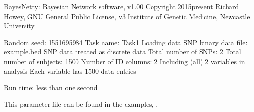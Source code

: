 \documentclass[letterpaper,10pt,english]{sphinxmanual}
\begin{document}
\begin{sphinxVerbatim}[commandchars=\\\{\}]
BayesNetty: Bayesian Network software, v1.00
\PYGZhy{}\PYGZhy{}\PYGZhy{}\PYGZhy{}\PYGZhy{}\PYGZhy{}\PYGZhy{}\PYGZhy{}\PYGZhy{}\PYGZhy{}\PYGZhy{}\PYGZhy{}\PYGZhy{}\PYGZhy{}\PYGZhy{}\PYGZhy{}\PYGZhy{}\PYGZhy{}\PYGZhy{}\PYGZhy{}\PYGZhy{}\PYGZhy{}\PYGZhy{}\PYGZhy{}\PYGZhy{}\PYGZhy{}\PYGZhy{}\PYGZhy{}\PYGZhy{}\PYGZhy{}\PYGZhy{}\PYGZhy{}\PYGZhy{}\PYGZhy{}\PYGZhy{}\PYGZhy{}\PYGZhy{}\PYGZhy{}\PYGZhy{}\PYGZhy{}\PYGZhy{}\PYGZhy{}\PYGZhy{}\PYGZhy{}\PYGZhy{}\PYGZhy{}\PYGZhy{}\PYGZhy{}\PYGZhy{}\PYGZhy{}
Copyright 2015\PYGZhy{}present Richard Howey, GNU General Public License, v3
Institute of Genetic Medicine, Newcastle University

Random seed: 1551695984
\PYGZhy{}\PYGZhy{}\PYGZhy{}\PYGZhy{}\PYGZhy{}\PYGZhy{}\PYGZhy{}\PYGZhy{}\PYGZhy{}\PYGZhy{}\PYGZhy{}\PYGZhy{}\PYGZhy{}\PYGZhy{}\PYGZhy{}\PYGZhy{}\PYGZhy{}\PYGZhy{}\PYGZhy{}\PYGZhy{}\PYGZhy{}\PYGZhy{}\PYGZhy{}\PYGZhy{}\PYGZhy{}\PYGZhy{}\PYGZhy{}\PYGZhy{}\PYGZhy{}\PYGZhy{}\PYGZhy{}\PYGZhy{}\PYGZhy{}\PYGZhy{}\PYGZhy{}\PYGZhy{}\PYGZhy{}\PYGZhy{}\PYGZhy{}\PYGZhy{}\PYGZhy{}\PYGZhy{}\PYGZhy{}\PYGZhy{}\PYGZhy{}\PYGZhy{}\PYGZhy{}\PYGZhy{}\PYGZhy{}\PYGZhy{}
Task name: Task\PYGZhy{}1
Loading data
SNP binary data file: example.bed
SNP data treated as discrete data
Total number of SNPs: 2
Total number of subjects: 1500
Number of ID columns: 2
Including (all) 2 variables in analysis
Each variable has 1500 data entries
\PYGZhy{}\PYGZhy{}\PYGZhy{}\PYGZhy{}\PYGZhy{}\PYGZhy{}\PYGZhy{}\PYGZhy{}\PYGZhy{}\PYGZhy{}\PYGZhy{}\PYGZhy{}\PYGZhy{}\PYGZhy{}\PYGZhy{}\PYGZhy{}\PYGZhy{}\PYGZhy{}\PYGZhy{}\PYGZhy{}\PYGZhy{}\PYGZhy{}\PYGZhy{}\PYGZhy{}\PYGZhy{}\PYGZhy{}\PYGZhy{}\PYGZhy{}\PYGZhy{}\PYGZhy{}\PYGZhy{}\PYGZhy{}\PYGZhy{}\PYGZhy{}\PYGZhy{}\PYGZhy{}\PYGZhy{}\PYGZhy{}\PYGZhy{}\PYGZhy{}\PYGZhy{}\PYGZhy{}\PYGZhy{}\PYGZhy{}\PYGZhy{}\PYGZhy{}\PYGZhy{}\PYGZhy{}\PYGZhy{}\PYGZhy{}

Run time: less than one second
\end{sphinxVerbatim}

\sphinxAtStartPar
This parameter file can be found  in the examples, .
\end{document}
